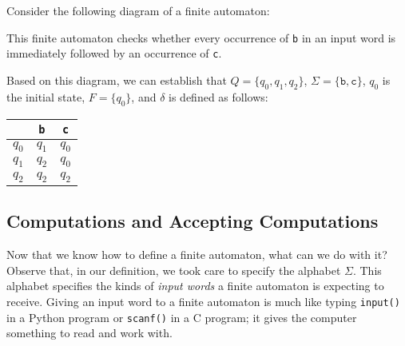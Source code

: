 \begin{example}
Consider the following diagram of a finite automaton:
\begin{center}
\end{center}
This finite automaton checks whether every occurrence of \texttt{b} in an input word is immediately followed by an occurrence of \texttt{c}.

Based on this diagram, we can establish that $Q = \{q_{0}, q_{1}, q_{2}\}$, $\Sigma = \{\texttt{b}, \texttt{c}\}$, $q_{0}$ is the initial state, $F = \{q_{0}\}$, and $\delta$ is defined as follows:
\begin{center}
\small
\begin{tabular}{c | c c}
		& \texttt{b}		& \texttt{c} \\
\hline
$q_{0}$	& $q_{1}$		& $q_{0}$ \\
$q_{1}$	& $q_{2}$		& $q_{0}$ \\
$q_{2}$	& $q_{2}$		& $q_{2}$
\end{tabular}
\end{center}
\end{example}

\subsection{Computations and Accepting Computations}

Now that we know how to define a finite automaton, what can we do with it? Observe that, in our definition, we took care to specify the alphabet $\Sigma$. This alphabet specifies the kinds of \emph{input words} a finite automaton is expecting to receive. Giving an input word to a finite automaton is much like typing \texttt{input()} in a Python program or \texttt{scanf()} in a C program; it gives the computer something to read and work with.

